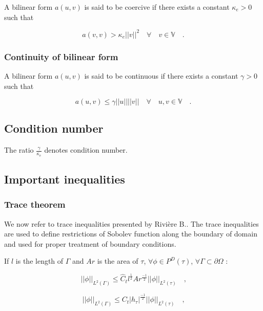 \documentclass[a4paper,twoside,openright]{book}
\begin{document}
\begin{appendices}
A bilinear form $a(u,v)$ is said to be coercive if there exists a constant $\kappa_e > 0$ such that

\begin{equation}\label{Coercivity}
a(v,v) > \kappa_e ||v||^2   \quad \forall \quad v \in  \mathbb{V} \quad \textrm{.}
\end{equation}

\subsubsection{Continuity of bilinear form}

A bilinear form $a(u,v)$ is said to be continuous if there exists a constant $\gamma > 0$ such that

\begin{equation}\label{Continuity_constant}
a(u,v) \leq \gamma ||u||||v|| \quad  \forall \quad u,v \in  \mathbb{V} \quad \textrm{.}
\end{equation}

\subsection{Condition number}

The ratio $\frac{\gamma}{\kappa_e}$ denotes condition number.

\subsection{Important inequalities}

\subsubsection{Trace theorem} 

We now refer to trace inequalities presented by Rivi\`ere B.\cite{riviere}. The trace inequalities are used to define restrictions of Sobolev function along the boundary of domain and used for proper treatment of boundary conditions. 

If $l$ is the length of $\Gamma$ and $Ar$ is the area of $\tau$,  $\forall \phi \in P^D (\tau)$, $\forall \Gamma \subset \partial \Omega$ :

\begin{equation}
||\phi||_{L^2(\Gamma)} \leq \hat{C}_t l^{\frac{1}{2}} Ar^{\frac{-1}{2}} ||\phi||_{L^2(\tau)} \quad \textrm{,}
\end{equation}

\begin{equation}
||\phi||_{L^2(\Gamma)} \leq {C}_t |h_\tau|^{\frac{-1}{2}} ||\phi||_{L^2(\tau)} \quad \textrm{,}
\end{equation}


\end{appendices}
\end{document}
